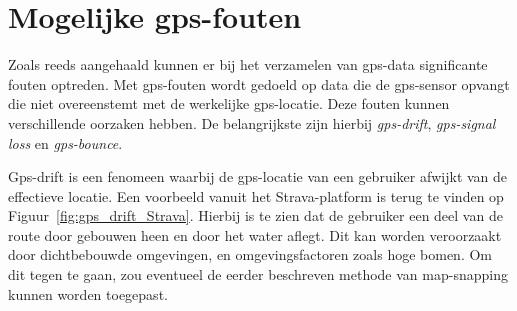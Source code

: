 \section{Mogelijke gps-fouten}\label{sec:gps-fouten}
Zoals reeds aangehaald kunnen er bij het verzamelen van \ac{gps}-data
significante fouten optreden. Met \ac{gps}-fouten wordt gedoeld op data die de
\ac{gps}-sensor opvangt die niet overeenstemt met de werkelijke
\ac{gps}-locatie. Deze fouten kunnen verschillende oorzaken hebben. De
belangrijkste zijn hierbij \textit{\ac{gps}-drift}, \textit{\ac{gps}-signal
    loss} en \textit{\ac{gps}-bounce}.

Gps-drift is een fenomeen waarbij de \ac{gps}-locatie van een gebruiker afwijkt
van de effectieve locatie. Een voorbeeld vanuit het Strava-platform is terug te
vinden op Figuur~\ref{fig:gps_drift_Strava}. Hierbij is te zien dat de
gebruiker een deel van de route door gebouwen heen en door het water aflegt.
Dit kan worden veroorzaakt door dichtbebouwde omgevingen, en omgevingsfactoren
zoals hoge bomen. Om dit tegen te gaan, zou eventueel de eerder beschreven
methode van map-snapping kunnen worden toegepast.
